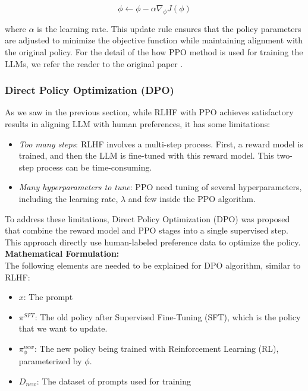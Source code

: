 \begin{equation}
    \phi \leftarrow \phi - \alpha \nabla_{\phi} J(\phi)
        \label{eq:ppo_update}
\end{equation}

where $\alpha$ is the learning rate. This update rule ensures that the policy parameters are adjusted to minimize the objective function while maintaining alignment with the original policy. For the detail of the how PPO method is used for training the 
LLMs, we refer the reader to the original paper \cite{zhengSecretsRLHFLarge2023}.

\subsubsection{Direct Policy Optimization (DPO)} \label{subsubsec:dpo}

As we saw in the previous section, while RLHF with PPO achieves satisfactory results in aligning LLM with human preferences, it has some limitations:

\begin{itemize}
    \item \textit{Too many steps}: RLHF involves a multi-step process. First, a reward model is trained, and then the LLM is fine-tuned with this reward model. This two-step process can be time-consuming.
     
    \item \textit{Many hyperparameters to tune}: PPO need tuning of several hyperparameters, including the learning rate, $\lambda$ and few inside the PPO algorithm.
    
\end{itemize}

To address these limitations, Direct Policy Optimization (DPO) \cite{rafailovDirectPreferenceOptimization2024a} was proposed that combine the reward model and PPO 
stages into a single supervised step. This approach directly use human-labeled preference data to optimize the policy. \\


\textbf{Mathematical Formulation:} \\


The following elements are needed to be explained for DPO algorithm, similar to RLHF:
\begin{itemize}
    \item $x$: The prompt 
    \item $\pi^{SFT}$: The old policy after Supervised Fine-Tuning (SFT), which is the policy that we want to update.
    \item $\pi^{new}_{\phi}$: The new policy being trained with Reinforcement Learning (RL), parameterized by $\phi$.
    \item $D_{new}$: The dataset of prompts used for training

\end{itemize}


